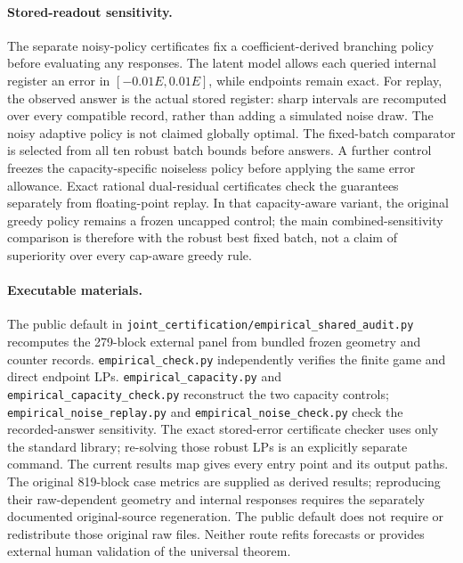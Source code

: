 \paragraph{Stored-readout sensitivity.}
The separate noisy-policy certificates fix a coefficient-derived branching
policy before evaluating any responses. The latent model allows each queried
internal register an error in $[-0.01E,0.01E]$, while endpoints remain exact.
For replay, the observed answer is the actual stored register: sharp intervals
are recomputed over every compatible record, rather than adding a simulated
noise draw. The noisy adaptive policy is not claimed globally optimal.
The fixed-batch comparator is selected from all ten robust batch bounds before
answers. A further control freezes the capacity-specific noiseless policy
before applying the same error allowance. Exact rational dual-residual
certificates check the guarantees separately from floating-point replay.
In that capacity-aware variant, the original greedy policy remains a frozen
uncapped control; the main combined-sensitivity comparison is therefore with
the robust best fixed batch, not a claim of superiority over every cap-aware
greedy rule.

\paragraph{Executable materials.}
The public default in \texttt{joint\_certification/empirical\_shared\_audit.py}
recomputes the 279-block external panel from bundled frozen geometry and
counter records. \texttt{empirical\_check.py} independently verifies the
finite game and direct endpoint LPs. \texttt{empirical\_capacity.py} and
\texttt{empirical\_capacity\_check.py} reconstruct the two capacity controls;
\texttt{empirical\_noise\_replay.py} and
\texttt{empirical\_noise\_check.py} check the recorded-answer sensitivity.
The exact stored-error certificate checker uses only the standard library;
re-solving those robust LPs is an explicitly separate command. The current
results map gives every entry point and its output paths. The original
819-block case metrics are supplied as derived results; reproducing their
raw-dependent geometry and internal responses requires the separately
documented original-source regeneration. The public default does not require
or redistribute those original raw files. Neither route refits forecasts or
provides external human validation of the universal theorem.

